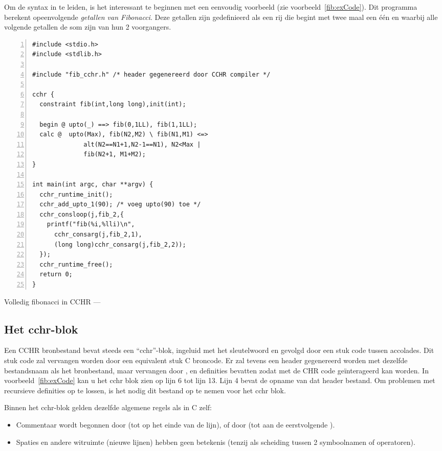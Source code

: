 Om de syntax in te leiden, is het interessant te beginnen met een eenvoudig voorbeeld (zie voorbeeld~\ref{fib:exCode}). Dit programma berekent opeenvolgende {\em getallen van Fibonacci}. Deze getallen zijn gedefinieerd als een rij die begint met twee maal een \'e\'en en waarbij alle volgende getallen de som zijn van hun 2 voorgangers.

\begin{exCode}
\begin{Verbatim}[frame=single,numbers=left]
#include <stdio.h>
#include <stdlib.h>

#include "fib_cchr.h" /* header gegenereerd door CCHR compiler */

cchr {
  constraint fib(int,long long),init(int);

  begin @ upto(_) ==> fib(0,1LL), fib(1,1LL);
  calc @  upto(Max), fib(N2,M2) \ fib(N1,M1) <=>
              alt(N2==N1+1,N2-1==N1), N2<Max |
              fib(N2+1, M1+M2);
}

int main(int argc, char **argv) {
  cchr_runtime_init();
  cchr_add_upto_1(90); /* voeg upto(90) toe */
  cchr_consloop(j,fib_2,{
    printf("fib(%i,%lli)\n", 
      cchr_consarg(j,fib_2,1),
      (long long)cchr_consarg(j,fib_2,2));
  });
  cchr_runtime_free();
  return 0;
}
\end{Verbatim}
\caption{\label{fib:exCode} Volledig fibonacci in CCHR --- }
\end{exCode}

\subsection{Het cchr-blok}

Een CCHR bronbestand bevat steeds een ``cchr''-blok, ingeluid met het sleutelwoord  en gevolgd door een stuk code tussen accolades. Dit stuk code zal vervangen worden door een equivalent stuk C broncode. Er zal tevens een header gegenereerd worden met dezelfde bestandsnaam als het bronbestand, maar  vervangen door , en definities bevatten zodat met de CHR code ge\"interageerd kan worden. In voorbeeld~\ref{fib:exCode} kan u het cchr blok zien op lijn 6 tot lijn 13. Lijn 4 bevat de opname van dat header bestand. Om problemen met recursieve definities op te lossen, is het nodig dit bestand op te nemen voor het cchr blok.

Binnen het cchr-blok gelden dezelfde algemene regels als in C zelf: \begin{itemize}
  \item Commentaar wordt begonnen door \code{//} (tot op het einde van de lijn), of door \code{/*} (tot aan de eerstvolgende \code{*/}).
  \item Spaties en andere witruimte (nieuwe lijnen) hebben geen betekenis (tenzij als scheiding tussen 2 symboolnamen of operatoren).
\end{itemize}

